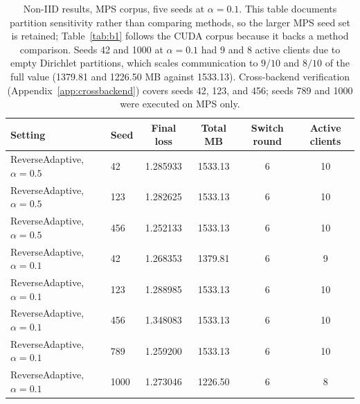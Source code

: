 \begin{table}[t]
\caption{Non-IID results, MPS corpus, five seeds at $\alpha{=}0.1$. This table documents partition sensitivity rather than comparing methods, so the larger MPS seed set is retained; Table~\ref{tab:b1} follows the CUDA corpus because it backs a method comparison. Seeds 42 and 1000 at $\alpha{=}0.1$ had 9 and 8 active clients due to empty Dirichlet partitions, which scales communication to $9/10$ and $8/10$ of the full value (1379.81 and 1226.50 MB against 1533.13). Cross-backend verification (Appendix~\ref{app:crossbackend}) covers seeds 42, 123, and 456; seeds 789 and 1000 were executed on MPS only.}
\label{tab:b2}
\begin{center}
\footnotesize
\setlength{\tabcolsep}{4pt}
\begin{tabular}{llcccc}
\toprule
Setting & Seed & Final loss & Total MB & Switch round & Active clients \\
\midrule
ReverseAdaptive, $\alpha{=}0.5$ & 42 & 1.285933 & 1533.13 & 6 & 10 \\
ReverseAdaptive, $\alpha{=}0.5$ & 123 & 1.282625 & 1533.13 & 6 & 10 \\
ReverseAdaptive, $\alpha{=}0.5$ & 456 & 1.252133 & 1533.13 & 6 & 10 \\
ReverseAdaptive, $\alpha{=}0.1$ & 42 & 1.268353 & 1379.81 & 6 & 9 \\
ReverseAdaptive, $\alpha{=}0.1$ & 123 & 1.288985 & 1533.13 & 6 & 10 \\
ReverseAdaptive, $\alpha{=}0.1$ & 456 & 1.348083 & 1533.13 & 6 & 10 \\
ReverseAdaptive, $\alpha{=}0.1$ & 789 & 1.259200 & 1533.13 & 6 & 10 \\
ReverseAdaptive, $\alpha{=}0.1$ & 1000 & 1.273046 & 1226.50 & 6 & 8 \\
\bottomrule
\end{tabular}
\end{center}
\end{table}

